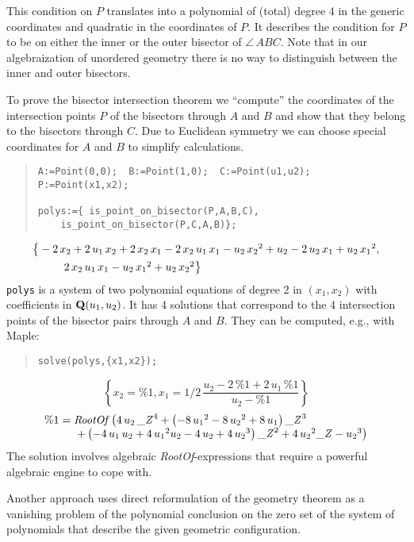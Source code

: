 \documentclass[11pt]{article}
\newcommand{\hsp}{\hspace*{1cm}}
\newcommand{\formel}[1]{\[\begin{array}{l}#1\end{array}\]}
\begin{document}
This condition on $P$ translates into a polynomial of (total)
degree 4 in the generic coordinates and quadratic in the
coordinates of $P$.  It describes the condition for $P$ to be on
either the inner or the outer bisector of $\angle\,ABC$. Note
that in our algebraization of unordered geometry there is no way
to distinguish between the inner and outer bisectors.

To prove the bisector intersection theorem we ``compute'' the
coordinates of the intersection points $P$ of the bisectors
through $A$ and $B$ and show that they belong to the bisectors
through $C$.  Due to Euclidean symmetry we can choose special
coordinates for $A$ and $B$ to simplify calculations.
\begin{quote}
\begin{verbatim}
A:=Point(0,0);  B:=Point(1,0);  C:=Point(u1,u2); 
P:=Point(x1,x2);

polys:={ is_point_on_bisector(P,A,B,C),
    is_point_on_bisector(P,C,A,B)};
\end{verbatim}
\end{quote}\vspace{-8pt}
\formel{\big\{ -2\,{x_2}+2\,{u_1}\,{x_2}+2\,{x_2}\,{x_1}
-2\,{x_2}\,{u_1}\,{x_1} -{u_2}\,{{x_2}}^{2}+{u_2}-2\,
{u_2}\,{x_1}+{u_2}\,{{x_1}}^{2},\\[4pt]\hsp 2\,{x_2}\,{u_1}\,{x_1}
-{u_2}\,{{x_1}}^{2}+{u_2}\,{{x_2}}^{2}\big\}} 
{\tt polys} is a system of two polynomial equations of degree 2 in
$(x_1,x_2)$ with coefficients in ${\bf Q}(u_1,u_2)$. It has 4
solutions that correspond to the 4 intersection points of the bisector
pairs through $A$ and $B$. They can be computed, e.g., with Maple: 
\begin{quote}
\begin{verbatim}
solve(polys,{x1,x2});
\end{verbatim}
\end{quote}
\[\left\{ {x_2}=\%1, {x_1}=1/2\,{\frac {{ u_2}-2\,\%1
+2\,{u_1}\,\%1 }{{u_2}-\%1}}\right\}\] 
\formel{\%1 = {\it RootOf} \left( 4\,{u_2}\,{{\it \_Z}}^{4}+
\left( -8\,{{u_1}}^{2}-8\,{{u_2}}^{2}+8\,{u_1} \right) {{ \it
\_Z}}^{3} \right. \\\hsp\left.  + \left( -4\,{u_1}\,{u_2}
+4\,{{u_1}}^{2}{u_2} -4\,{u_2} +4\,{{u_2}}^{3} \right) {{\it
\_Z}}^{2} +4\,{{u_2}}^{2}{\it \_Z}-{{u_2}}^{3} \right)}
The solution involves algebraic {\it RootOf\/}-expressions that
require a powerful algebraic engine to cope with.

Another approach uses direct reformulation of the geometry
theorem as a vanishing problem of the polynomial conclusion on
the zero set of the system of polynomials that describe the given
geometric configuration.
\end{document}
